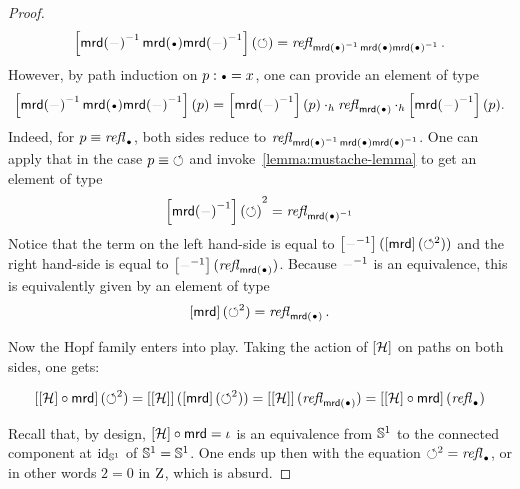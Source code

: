 \documentclass[english,a4]{article}
\renewcommand{\ap}[1]{\left[{#1}\right]}
\begin{document}
\begin{proof}
  \begin{displaymath}
    \ap{\inv{\mrd(\blank)} \mrd(\base) \inv{\mrd(\blank)}}(\Sloop) =
    \refl{\inv{\mrd(\base)} \mrd(\base) \inv{\mrd(\base)}}.
  \end{displaymath}
  However, by path induction on $p\from \base = x$, one can provide an
  element of type
  \begin{displaymath}
    \ap{\inv{\mrd(\blank)} \mrd(\base) \inv{\mrd(\blank)}}(p) =
    \ap{\inv{\mrd(\blank)}}(p) \hcomp \refl{\mrd(\base)}
    \hcomp \ap{\inv{\mrd(\blank)}}(p). 
  \end{displaymath}
  Indeed, for $p\jdeq \refl{\base}$, both sides reduce to
  $\refl{\inv{\mrd(\base)} \mrd(\base) \inv{\mrd(\base)}}$. One can
  apply that in the case $p\equiv \mathord{\circlearrowleft}$ and
  invoke~\cref{lemma:mustache-lemma} to get an element of type
  \begin{displaymath}
    {\ap{\inv{\mrd(\blank)}}(\Sloop)}^2 = \refl{\inv{\mrd(\base)}}
  \end{displaymath}
  Notice that the term on the left hand-side is equal to
  $\ap{\inv{\blank}}(\ap\mrd (\Sloop^2))$ and the right hand-side is
  equal to $\ap{\inv{\blank}}(\refl{\mrd(\base)})$. Because
  $\inv{\blank}$ is an equivalence, this is equivalently given by an
  element of type
  \begin{displaymath}
    \ap\mrd(\Sloop^2) = \refl{\mrd(\base)}.
  \end{displaymath}

  Now the Hopf family enters into play. Taking the action of $\ap\hopf$ on
  paths on both sides, one gets:
  
  \begin{displaymath}
    \ap{\ap\hopf\circ \mrd}(\Sloop^2) = \ap{\ap\hopf}(\ap\mrd(\Sloop^2)) =
    \ap{\ap\hopf}(\refl{\mrd(\base)}) = \ap{\ap\hopf\circ \mrd}(\refl{\base})
  \end{displaymath}
  
  Recall that, by design, ${\ap\hopf}\circ{\mrd} = \iota$ is an equivalence
  from ${{\mathbb S^{1}}}$ to the connected component at $\mathord{\mathrm{id}}_{{\mathbb S^{1}}}$ of ${{\mathbb S^{1}}}={{\mathbb S^{1}}}$. One ends up
  then with the equation $\Sloop^2 = \refl \base$, or in other words $2=0$ in
  $\mathrm{Z}$, which is absurd.
  
\end{proof}
\end{document}

